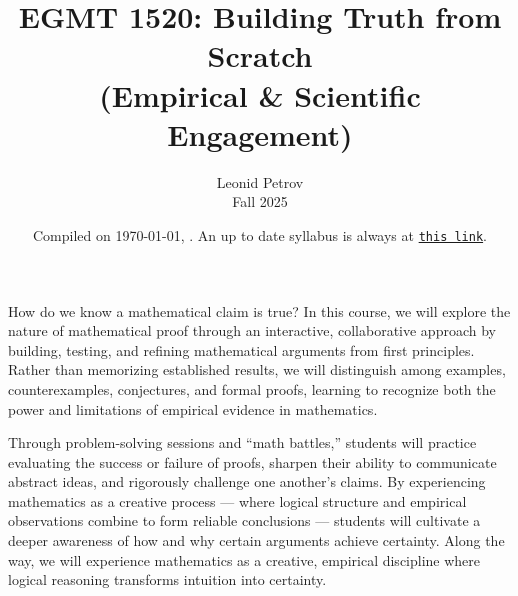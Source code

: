 \documentclass[oneside,11pt]{amsart}
\begin{document}
\title[Building Truth from Scratch]{EGMT 1520: Building Truth from Scratch\\(Empirical \& Scientific Engagement)}
\author{Leonid Petrov\\Fall 2025}
\date{Compiled on \today, \currenttime. An up to date syllabus is always at \href{https://github.com/lenis2000/Syllabi/blob/master/Syllabus_EGMT_f25.pdf}{\texttt{this link}}.}
\maketitle

\bigskip


How do we know a mathematical claim is true?
In this course, we
will explore the nature of mathematical proof through an
interactive, collaborative approach
by building, testing, and refining mathematical arguments from first principles.
Rather than memorizing
established results, we will distinguish among examples,
counterexamples, conjectures, and formal proofs, learning to
recognize both the power and limitations of empirical
evidence in mathematics.

Through problem-solving sessions and “math battles,”
students will practice evaluating the success or failure of
proofs, sharpen their ability to communicate abstract ideas,
and rigorously challenge one another’s claims. By
experiencing mathematics as a creative process --- where logical
structure and empirical observations combine to form
reliable conclusions --- students will cultivate a deeper
awareness of how and why certain arguments achieve
certainty.  Along the way, we will experience mathematics as a creative, empirical discipline where
logical reasoning transforms intuition into certainty.

\medskip
\end{document}
